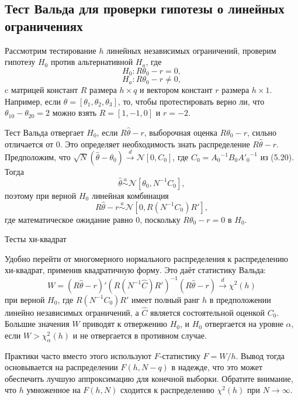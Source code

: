 \subsection{Тест Вальда для проверки гипотезы о линейных ограничениях}

Рассмотрим тестирование $h$ линейных независимых ограничений, проверим гипотезу $H_0$ против альтернативной $H_a$, где
\[
H_0: R \theta_0 - r = 0,
\]
\[
H_a: R \theta_0 - r \not= 0,
\]
c матрицей констант $R$ размера $h \times q$ и вектором констант $r$ размера $h \times 1$. Например, если $\theta=[\theta_1, \theta_2, \theta_3]$, то, чтобы протестировать верно ли, что $\theta_{10}-\theta_{20}=2$ можно взять $R=[1,-1,0]$ и $r=-2$.

Тест Вальда отвергает $H_0$, если $R\hat{\theta} - r$, выборочная оценка $R \theta_0 - r$, сильно отличается от $0$. Это определяет необходимость знать распределение $R\hat{\theta} - r$. Предположим, что $\sqrt{N}(\hat{\theta}-\theta_0) \xrightarrow{d} \mathcal{N}[0,C_0]$, где $C_0={A_0}^{-1} B_0 {A'_0}^{-1}$ из (5.20). Тогда 
\[
\hat{\theta} \stackrel{a}{\sim} \mathcal{N}[\theta_0, N^{-1} C_0],
\]
поэтому при верной $H_0$ линейная комбинация 
\[
R\hat{\theta}-r \stackrel{a}{\sim} \mathcal{N}[0,R(N^{-1}C_0)R'],
\]
где математическое ожидание равно 0, поскольку $R \theta_0 - r = 0$ в $H_0$.

\begin{center}
Тесты хи-квадрат
\end{center}

Удобно перейти от многомерного нормального распределения к распределению хи-квадрат, применив квадратичную форму. Это даёт статистику Вальда:
\begin{equation}
W=(R\hat{\theta}-r)'(R(N^{-1}\hat{C})R')^{-1}(R\hat{\theta}-r) \xrightarrow{d} \chi^{2}(h)
\end{equation}
при верной $H_0$, где $R(N^{-1}C_0)R'$ имеет полный ранг $h$ в предположении линейно независимых ограничений, а $\hat{C}$ является состоятельной оценкой $C_0$. Большие значения $W$ приводят к отвержению $H_0$, и $H_0$ отвергается на уровне $\alpha$, если $W>\chi_{\alpha}^{2}(h)$ и не отвергается в противном случае.

Практики часто вместо этого используют $F$-статистику $F=W/h$. Вывод тогда основывается на распределении $F(h,N-q)$ в надежде, что это может обеспечить лучшую аппроксимацию для конечной выборки. Обратите внимание, что $h$ умноженное на $F(h,N)$ сходится к распределению $\chi^{2}(h)$ при $N \rightarrow \infty$.

